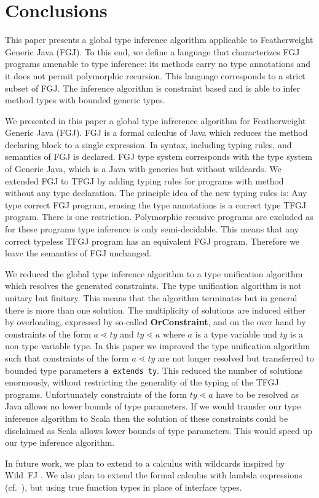 \section{Conclusions}
\label{sec:conclusions}

This paper presents a global type inference algorithm applicable to
Featherweight Generic Java (FGJ). To this end, we define a language
\FGJGT that characterizes FGJ programs amenable to type inference: its
methods carry no type annotations and it does not permit polymorphic recursion.
This language corresponds to a strict subset of FGJ.
The inference algorithm is constraint based and is able to infer
method types with bounded generic types. 

We presented in this paper a global type infrerence algorithm for Featherweight
Generic Java (FGJ). FGJ is a formal calculus of Java which reduces the method
declaring block to a single expression. In
\cite{DBLP:journals/toplas/IgarashiPW01} syntax, including typing rules, and semantics of FGJ is
declared. FGJ type system corresponds with the type system of Generic Java, which is a Java with generics but without wildcards. We extended FGJ to TFGJ by adding typing rules for
programs with method without any type declaration. The principle idea of the
new typing rules is: Any type correct FGJ program, erasing the type
annotations is a correct type TFGJ program. There is one
restriction. Polymorphic recusive programs are excluded as for these programs
type inference is only semi-decidable. This means that any correct typeless TFGJ program
has an equivalent FGJ program. Therefore we leave the semantics of FGJ unchanged.

We reduced the global type inference algorithm to a type unification algorithm
which resolves the generated constraints. The type unification algorithm is not
unitary but finitary. This means that the algorithm terminates but in general
there is more than one solution. The multiplicity of solutions are induced
either by overloading, expressed by so-called \textbf{OrConstraint}, and on the over hand by constraints of the form $a
\lessdot ty$ and $ty \lessdot a$ where $a$ is a type variable und $ty$ is a non
type variable type. In this paper we improved the type unification algorithm
such that constraints of the form $a \lessdot ty$ are not longer resolved but
transferred to bounded type parameters \texttt{a extends ty}. This reduced the
number of solutions enormously, without restricting the generality of the typing
of the TFGJ programs. Unfortunately constraints of the form $ty \lessdot a$ have
to be resolved as Java allows no lower bounds of type parameters. If we would
transfer our type inference algorithm to Scala then the solution of these
constraints could be disclaimed as Scala allows lower bounds of type
parameters. This would speed up our type inference algorithm.
\fi

In future work, we plan to extend \FGJGT to a calculus with wildcards
inspired by Wild~FJ \cite{TEP05}. 
We also plan to extend the formal calculus with lambda expressions
(cf.\ \cite{BBDGV18}), but using true function types in place of
interface types.



